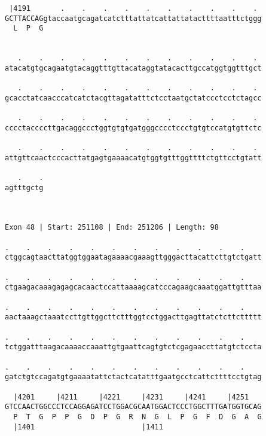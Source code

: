 \documentclass{article}
\begin{document}
\begin{Verbatim}
 |4191       .    .    .    .    .    .    .    .    .    . 
GCTTACCAGgtaccaatgcagatcatctttattatcattattatacttttaatttctggg
  L  P  G                                                   
                                                            
  
   .    .    .    .    .    .    .    .    .    .    .    . 
atacatgtgcagaatgtacaggtttgttacataggtatacacttgccatggtggtttgct
                                                            
   .    .    .    .    .    .    .    .    .    .    .    . 
gcacctatcaacccatcatctacgttagatatttctcctaatgctatccctcctctagcc
                                                            
   .    .    .    .    .    .    .    .    .    .    .    . 
cccctaccccttgacaggccctggtgtgtgatgggcccctccctgtgtccatgtgttctc
                                                            
   .    .    .    .    .    .    .    .    .    .    .    . 
attgttcaactcccacttatgagtgaaaacatgtggtgtttggttttctgttcctgtatt
                                                            
   .    .
agtttgctg
         
         
 
Exon 48 | Start: 251108 | End: 251206 | Length: 98
 
.    .    .    .    .    .    .    .    .    .    .    .    
ctggcagtaacttatggtggaatagaaaacgaaagttgggacttacattcttgtctgatt
                                                            
.    .    .    .    .    .    .    .    .    .    .    .    
ctgaagacaaagagagcacaactccattaaaagcatcccagaagcaaatggattgtttaa
                                                            
.    .    .    .    .    .    .    .    .    .    .    .    
aactaaagctaaatccttgttggcttctttggtcctggacttgagttatctcttcttttt
                                                            
.    .    .    .    .    .    .    .    .    .    .    .    
tctggatttaagacaaaaccaaattgtgaattcagtgtctcgagaaccttatgtctccta
                                                            
.    .    .    .    .    .    .    .    .    .    .    .    
gatctgtccagatgtgaaaatattctactcatatttgaatgcctcattcttttcctgtag
                                                            
  |4201     |4211     |4221     |4231     |4241     |4251   
GTCCAACTGGCCCTCCAGGAGATCCTGGACGCAATGGACTCCCTGGCTTTGATGGTGCAG
  P  T  G  P  P  G  D  P  G  R  N  G  L  P  G  F  D  G  A  G
  |1401                         |1411                       
  

\end{Verbatim}
\end{document}

